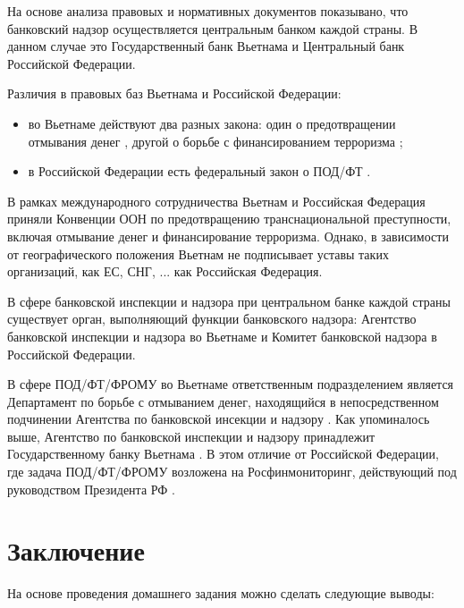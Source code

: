 \documentclass{article}
\begin{document}
На основе анализа правовых и нормативных документов показывано, что банковский надзор осуществляется центральным банком каждой страны. В данном случае это Государственный банк Вьетнама и Центральный банк Российской Федерации.

Различия в правовых баз Вьетнама и Российской Федерации:

\begin{itemize}
  \item во Вьетнаме действуют два разных закона: один о предотвращении отмывания денег \cite{law14}, другой о борьбе с финансированием терроризма \cite{law28};
  \item в Российской Федерации есть федеральный закон о ПОД/ФТ \cite{fz115}.
\end{itemize}

В рамках международного сотрудничества Вьетнам и Российская Федерация приняли Конвенции ООН по предотвращению транснациональной преступности, включая отмывание денег и финансирование терроризма. Однако, в зависимости от географического положения Вьетнам не подписывает уставы таких организаций, как ЕС, СНГ, ... как Российская Федерация.

В сфере банковской инспекции и надзора при центральном банке каждой страны существует орган, выполняющий функции банковского надзора: Агентство банковской инспекции и надзора во Вьетнаме и Комитет банковской надзора в Российской Федерации.

В сфере ПОД/ФТ/ФРОМУ во Вьетнаме ответственным подразделением является Департамент по борьбе с отмыванием денег, находящийся в непосредственном подчинении Агентства по банковской инсекции и надзору \cite{qdttg2019}. Как упоминалось выше, Агентство по банковской инспекции и надзору принадлежит Государственному банку Вьетнама \cite{ndcp2614}. В этом отличие от Российской Федерации, где задача ПОД/ФТ/ФРОМУ возложена на Росфинмониторинг, действующий под руководством Президента РФ \cite{pre808}.

\newpage

\section*{Заключение}

На основе проведения домашнего задания можно сделать следующие выводы:
\end{document}
